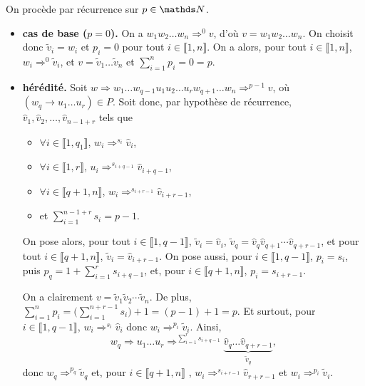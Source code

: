 \begin{prv}
	On procède par récurrence sur $p \in \N$.
	\begin{itemize}
		\item\textbf{cas de base ($p = 0$).} On a $w_1w_2\ldots w_n \Rightarrow^0 v$, d'où $v = w_1 w_2 \ldots w_n$. On choisit donc $\tilde{v}_i = w_i$ et $p_i = 0$ pour tout $i \in \llbracket 1,n\rrbracket$. On a alors, pour tout $i \in \llbracket 1,n \rrbracket$, $w_i \Rightarrow^0 \tilde{v}_i$, et $v = \tilde{v}_1 \ldots \tilde{v}_n$ et $\sum_{i=1}^n p_i = 0 = p$.
		\item \textbf{hérédité.}
			Soit $w \Rightarrow w_1\ldots w_{q-1} u_1u_2\ldots u_r w_{q+1}\ldots w_n \Rightarrow^{p-1} v$, où $(w_q \to u_1\ldots u_r) \in P$.
			Soit donc, par hypothèse de récurrence, $\hat{v}_1, \hat{v}_2, \ldots, \hat{v}_{n-1+r}$ tels que
			\begin{itemize}
				\item $\forall i \in \llbracket 1,q_1 \rrbracket$, $w_i \Rightarrow^{s_i} \hat{v}_i$,
				\item $\forall i \in \llbracket 1,r \rrbracket$, $u_i \Rightarrow^{s_{i+q-1}} \hat{v}_{i+q-1}$,
				\item $\forall i \in \llbracket q+1,n \rrbracket$, $w_i \Rightarrow^{s_{i + r-1}} \hat{v}_{i+r-1}$,
				\item et $\sum_{i=1}^{n-1+r} s_i = p - 1$.
			\end{itemize}
			On pose alors, pour tout $i \in \llbracket 1,q-1 \rrbracket$, $\tilde{v}_i = \hat{v}_i$,  $\tilde{v}_q = \hat{v}_q \hat{v}_{q+1} \cdots \hat{v}_{q+r - 1}$, et pour tout $i \in \llbracket q+1,n \rrbracket$, $\tilde{v}_i = \hat{v}_{i+r - 1}$.
			On pose aussi, pour $i \in \llbracket 1,q-1 \rrbracket$, $p_i = s_i$, puis $p_q = 1 + \sum_{i=1}^r s_{i+q-1}$, et, pour $i \in \llbracket q+1,n \rrbracket$, $p_i = s_{i+r - 1}$.

			On a clairement $v = \tilde{v}_1 \tilde{v}_2 \cdots \tilde{v}_n$.
			De plus, $\sum_{i=1}^n p_i = \Big(\sum_{i=1}^{n+r-1} s_i\Big) + 1 = (p - 1) + 1 = p$.
			Et surtout, pour $i \in \llbracket 1,q-1 \rrbracket$, $w_i \Rightarrow^{s_i} \hat{v}_i$ donc $w_i \Rightarrow^{p_i} \tilde{v}_i$.
			Ainsi, \[
				w_q \Rightarrow u_1 \ldots u_r \Rightarrow^{\sum_{i=1}^r s_{i+q-1}} \underbrace{\hat{v}_q \ldots \hat{v}_{q+r-1}}_{\tilde{v}_q}
			,\] donc $w_q \Rightarrow^{p_q} \tilde{v}_q$ et, pour $i \in \llbracket q+1,n \rrbracket$ , $w_i \Rightarrow^{s_{i+r-1}} \hat{v}_{r+r-1}$ et $w_i \Rightarrow^{p_i} \tilde{v}_i$.
	\end{itemize}
\end{prv}

